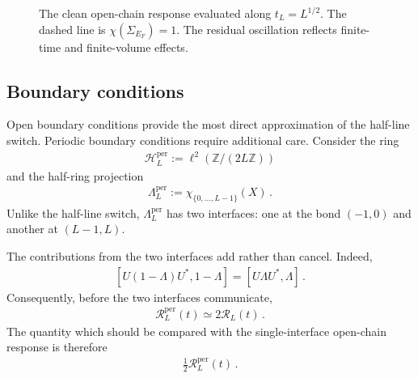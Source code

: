 \documentclass[a4paper,10pt]{article}
\numberwithin{equation}{section}
\theoremstyle{plain}
\theoremstyle{plain}
\theoremstyle{plain}
\theoremstyle{plain}
\theoremstyle{plain}
\theoremstyle{remark}
\theoremstyle{definition}
\theoremstyle{plain}
\newcommand{\ZZ}{\mathbb{Z}}
\newcommand{\calR}{\mathcal{R}}
\newcommand{\calH}{\mathcal{H}}
\newcommand{\eq}[1]{\begin{align*}#1\end{align*}}
\begin{document}
\begin{figure}[ht]
\centering
{}
\caption{The clean open-chain response evaluated along
$t_L=L^{1/2}$. The dashed line is
$\chi(\Sigma_{E_F})=1$. The residual oscillation reflects finite-time and
finite-volume effects.}
\label{fig:clean thermodynamic sequence}
\end{figure}

\subsection{Boundary conditions}

Open boundary conditions provide the most direct approximation of the
half-line switch. Periodic boundary conditions require additional care.
Consider the ring
\eq{\calH_L^{\mathrm{per}}
:=\ell^2\left(\ZZ/(2L\ZZ)\right)}
and the half-ring projection
\eq{\Lambda_L^{\mathrm{per}}
:=\chi_{\{0,\ldots,L-1\}}(X)\,.}
Unlike the half-line switch, $\Lambda_L^{\mathrm{per}}$ has two interfaces:
one at the bond $(-1,0)$ and another at $(L-1,L)$.

The contributions from the two interfaces add rather than cancel. Indeed,
\eq{\left[
U(1-\Lambda)U^*,1-\Lambda
\right]
=
[U\Lambda U^*,\Lambda]\,.}
Consequently, before the two interfaces communicate,
\eq{\calR_L^{\mathrm{per}}(t)
\simeq 2\calR_L(t)\,.}
The quantity which should be compared with the single-interface open-chain
response is therefore
\eq{\frac{1}{2}\calR_L^{\mathrm{per}}(t)\,.}
\end{document}
